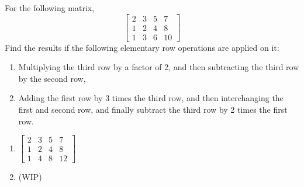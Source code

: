 \begin{Exercise}
For the following matrix,
\[
\begin{bmatrix}
2 & 3 & 5 & 7\\
1 & 2 & 4 & 8\\
1 & 3 & 6 & 10
\end{bmatrix}
\]
Find the results if the following elementary row operations are applied on it: 
\begin{enumerate}[label=(\alph*)]
\item Multiplying the third row by a factor of 2, and then subtracting the third row by the second row,
\item Adding the first row by 3 times the third row, and then interchanging the first and second row, and finally subtract the third row by 2 times the first row.\\
\end{enumerate}
\end{Exercise}
\begin{Answer}
\begin{enumerate}[label=(\alph*)]
\item $\begin{bmatrix}
2 & 3 & 5 & 7 \\
1 & 2 & 4 & 8 \\
1 & 4 & 8 & 12
\end{bmatrix}$
\item (WIP)
\end{enumerate}
\end{Answer}

